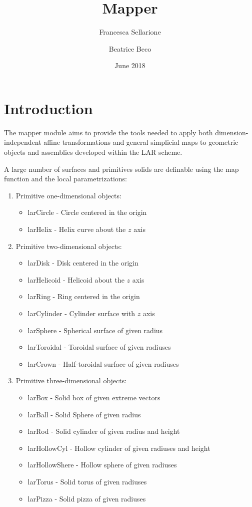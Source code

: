 \documentclass{article}
\title{\textbf{Mapper}}
\date{June 2018}
\author{Francesca Sellarione \and Beatrice Beco}
\begin{document}
\maketitle
\tableofcontents
\newpage

\section{Introduction}
The mapper module aims to provide the tools needed to apply both dimension-independent affine transformations and general simplicial maps to geometric objects and assemblies developed within the LAR scheme.

A large number of surfaces and primitives solids are definable using the map function and the local parametrizations:

\begin{enumerate}
\item Primitive one-dimensional objects: 
\begin{itemize}
\item larCircle - Circle centered in the origin
\item larHelix - Helix curve about the $z$ axis
\end{itemize}
\item Primitive two-dimensional objects:
\begin{itemize}
\item larDisk - Disk centered in the origin
\item larHelicoid - Helicoid about the $z$ axis 
\item larRing - Ring centered in the origin
\item larCylinder - Cylinder surface with $z$ axis
\item larSphere - Spherical surface of given radius
\item larToroidal - Toroidal surface of given radiuses
\item larCrown - Half-toroidal surface of given radiuses
\end{itemize}
\item Primitive three-dimensional objects: 
\begin{itemize}
\item larBox - Solid box of given extreme vectors
\item larBall - Solid Sphere of given radius
\item larRod - Solid cylinder of given radius and height
\item larHollowCyl - Hollow cylinder of given radiuses and height
\item larHollowShere - Hollow sphere of given radiuses
\item larTorus - Solid torus of given radiuses
\item larPizza - Solid pizza of given radiuses 
\end{itemize}
\end{enumerate}
\end{document}
